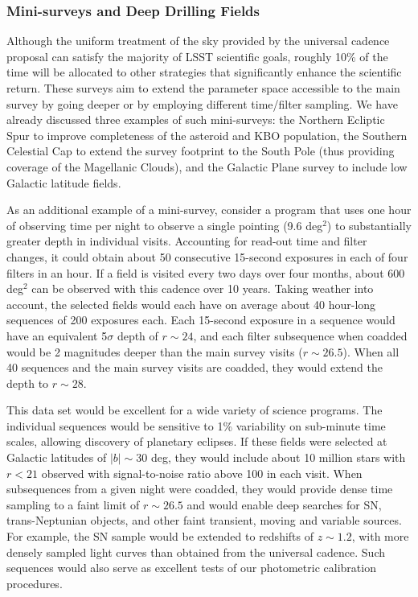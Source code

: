 \subsubsection{ Mini-surveys and Deep Drilling Fields}
\label{Sec:minisurveys}

Although the uniform treatment of the sky provided by the universal cadence
proposal can satisfy the majority of LSST scientific goals, roughly 10\%
of the time will be allocated to other strategies that significantly enhance the
scientific return.  These surveys aim to extend the parameter space accessible
to the main survey by going deeper or by employing different time/filter
sampling.  We have already discussed three examples of such
mini-surveys: the Northern Ecliptic Spur to improve completeness of
the asteroid and KBO population, the Southern Celestial Cap to extend
the survey footprint to the South Pole (thus providing coverage of the
Magellanic Clouds), and the Galactic Plane survey to include low
Galactic latitude fields.

As an additional  example of a mini-survey, consider a program that
uses one hour of
observing time per night to observe a single pointing (9.6 deg$^2$) to
substantially greater depth in individual visits. Accounting for
read-out time and filter changes, it could obtain about 50 consecutive
15-second exposures in each of four filters in an hour. If a field is visited
every two days over four months, about 600 deg$^2$ can be observed with this
cadence over 10 years. Taking weather into account, the selected fields would
each have on average about 40 hour-long sequences of 200 exposures each. Each
15-second exposure in a sequence would have an equivalent 5$\sigma$ depth of
$r\sim24$, and each filter subsequence when coadded would be 2 magnitudes
deeper than the main survey visits ($r\sim26.5$). When all 40 sequences and
the main survey visits are coadded, they would extend the depth to $r\sim28$.

This data set would be excellent for a wide variety of science programs. The
individual sequences would be sensitive to 1\% variability on sub-minute time
scales, allowing discovery of planetary eclipses. If these fields were selected
at Galactic latitudes of $|b|\sim30$ deg, they would include about 10 million
stars with $r<21$ observed with signal-to-noise ratio above 100 in each visit.
When subsequences from a given night were coadded, they would
provide dense time sampling to a faint limit of $r\sim26.5$
and would enable deep searches
for SN, trans-Neptunian objects, and other faint transient, moving and
variable sources.  For example, the SN sample
would be extended to redshifts of $z\sim1.2$, with more densely sampled light
curves than obtained from the universal cadence. Such sequences would also
serve as excellent tests of our photometric calibration procedures.


